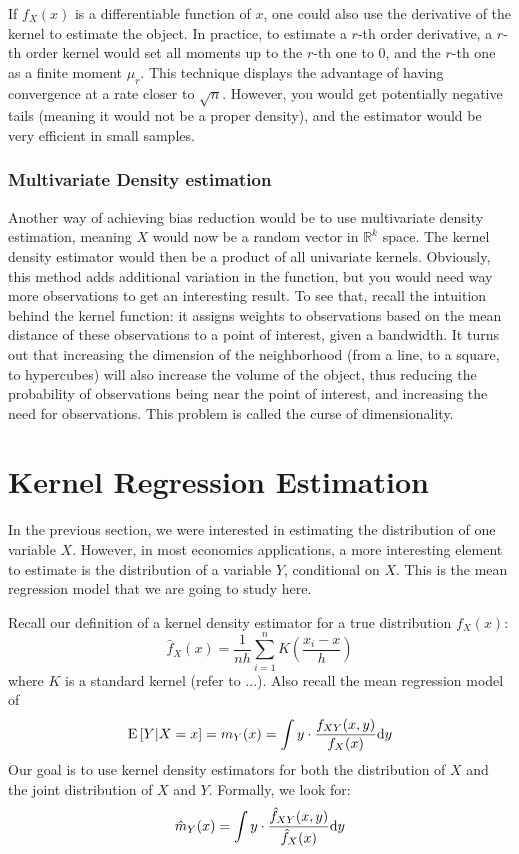 If $f_X(x)$ is a differentiable function of $x$, one could also use the derivative of the kernel to estimate the object. In practice, to estimate a $r$-th order derivative, a $r$-th order kernel would set all moments up to the $r$-th one to 0, and the $r$-th one as a finite moment $\mu_r$. This technique displays the advantage of having convergence at a rate closer to $\sqrt{n}$. However, you would get potentially negative tails (meaning it would not be a proper density), and the estimator would be very efficient in small samples.

\subsubsection{Multivariate Density estimation}

Another way of achieving bias reduction would be to use multivariate density estimation, meaning $X$ would now be a random vector in $\mathbb{R}^k$ space. The kernel density estimator would then be a product of all univariate kernels. Obviously, this method adds additional variation in the function, but you would need way more observations to get an interesting result. To see that, recall the intuition behind the kernel function: it assigns weights to observations based on the mean distance of these observations to a point of interest, given a bandwidth. It turns out that increasing the dimension of the neighborhood (from a line, to a square, to hypercubes) will also increase the volume of the object, thus reducing the probability of observations being near the point of interest, and increasing the need for observations. This problem is called the curse of dimensionality.

\section{Kernel Regression Estimation}

In the previous section, we were interested in estimating the distribution of one variable $X$. However, in most economics applications, a more interesting element to estimate is the distribution of a variable $Y$, conditional on $X$. This is the mean regression model that we are going to study here.

Recall our definition of a kernel density estimator for a true distribution $f_X(x)$: $$ \hat f_X(x) = \frac{1}{nh} \sum_{i=1}^{n} K\left(\frac{x_i - x}{h}\right) $$ where $K$ is a standard kernel (refer to ...). Also recall the mean regression model of $$\operatorname{E}\left[Y\vert X = x\right] = m_Y(x) = \int y\cdot \frac{f_{XY}(x, y)}{f_X(x)}\mathrm{d} y $$ Our goal is to use kernel density estimators for both the distribution of $X$ and the joint distribution of $X$ and $Y$. Formally, we look for: $$ \hat m_Y(x) = \int y\cdot \frac{\hat f_{XY}(x, y)}{\hat f_X(x)}\mathrm{d} y $$ 

